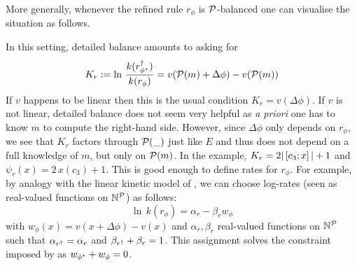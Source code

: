 More generally,
whenever the refined rule $r_\phi$ is $\mathcal{P}$-balanced
one can visualise the situation as follows.
\begin{center}
\end{center}
In this setting, detailed balance amounts to asking for
\begin{equation}
  \label{eq:non-linear-db}
  K_r := \ln\, \frac{ k(r_{\phi^\star}^\dagger) }{ k(r_\phi) } =
  v(\mathcal{P}(m) + \Delta\phi) - v(\mathcal{P}(m))
\end{equation}
If $v$ happens to be linear
then this is the usual condition
$K_r = v(\Delta\phi)$.
If $v$ is not linear,
detailed balance does not seem very helpful
as \emph{a priori} one has to know $m$
to compute the right-hand side.
However, since $\Delta\phi$ only depends on $r_\phi$,
we see that $K_r$ factors through $\mathcal{P}(\_)$ just like $E$
and thus does not depend on a full knowledge of $m$,
but only on $\mathcal{P}(m)$.
In the example, $K_r = 2 |\left[c_3;x\right]| + 1$
and $\psi_r(x) = 2\,x(c_3)+1$.
%
This is good enough to define rates for $r_\phi$.
For example,
by analogy with the linear kinetic model of ,
we can choose log-rates
(seen as real-valued functions on $\mathbb{N}^{\mathcal{P}}$)
as follows:
\begin{equation}
  \label{eq:non-linear-lkm}
  \ln\, k(r_\phi) = \alpha_r - \beta_r w_\phi
\end{equation}
with $w_\phi(x) = v(x + \Delta\phi) - v(x)$
and $\alpha_r,\beta_r$ real-valued functions on $\mathbb{N}^{\mathcal{P}}$
such that $\alpha_{r^\dagger} = \alpha_r$
and $\beta_{r^\dagger} + \beta_r = 1$.
This assignment solves the constraint
imposed by 
as $w_{\phi^\star} + w_\phi = 0$.

